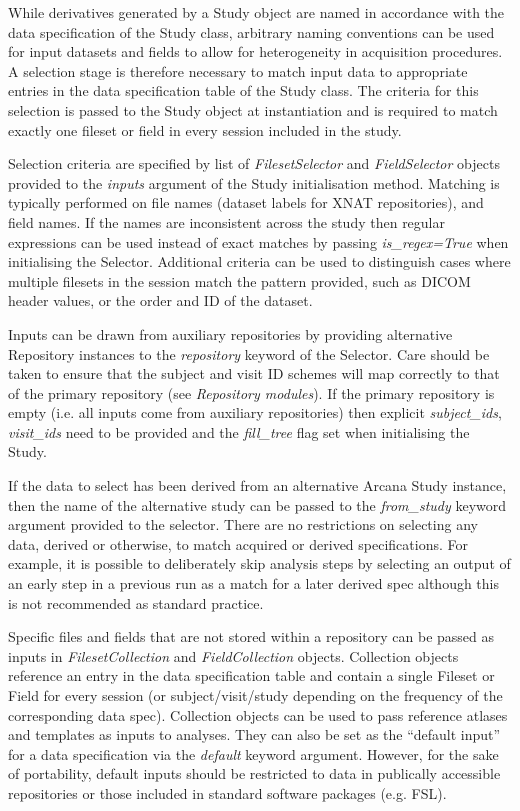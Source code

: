 \documentclass[smallextended]{svjour3}       %
\begin{document}
While derivatives generated by a Study object are named in accordance
with the data specification of the Study class, arbitrary naming
conventions can be used for input datasets and fields to allow for
heterogeneity in acquisition procedures. A selection stage is therefore
necessary to match input data to appropriate entries in the data
specification table of the Study class. The criteria for this selection
is passed to the Study object at instantiation and is required to match
exactly one fileset or field in every session included in the study.

Selection criteria are specified by list of \emph{FilesetSelector} and
\emph{FieldSelector} objects provided to the \emph{inputs} argument of
the Study initialisation method. Matching is typically performed on file
names (dataset labels for XNAT repositories), and field names. If the
names are inconsistent across the study then regular expressions can be
used instead of exact matches by passing \emph{is\_regex=True} when
initialising the Selector. Additional criteria can be used to
distinguish cases where multiple filesets in the session match the
pattern provided, such as DICOM header values, or the order and ID
of the dataset.

Inputs can be drawn from auxiliary repositories by providing alternative
Repository instances to the \emph{repository} keyword of the Selector.
Care should be taken to ensure that the subject and visit ID schemes
will map correctly to that of the primary repository (see
\emph{Repository modules}). If the primary repository is empty (i.e. all
inputs come from auxiliary repositories) then explicit
\emph{subject\_ids}, \emph{visit\_ids} need to be provided and the
\emph{fill\_tree} flag set when initialising the Study.

If the data to select has been derived from an alternative Arcana Study
instance, then the name of the alternative study can be passed to the
\emph{from\_study} keyword argument provided to the selector. There are
no restrictions on selecting any data, derived or otherwise, to match
acquired or derived specifications. For example, it is possible to
deliberately skip analysis steps by selecting an output of an early step
in a previous run as a match for a later derived spec although this is
not recommended as standard practice.

Specific files and fields that are not stored within a repository can be
passed as inputs in \emph{FilesetCollection} and \emph{FieldCollection}
objects. Collection objects reference an entry in the data specification
table and contain a single Fileset or Field for every session (or
subject/visit/study depending on the frequency of the corresponding data
spec). Collection objects can be used to pass reference atlases and
templates as inputs to analyses. They can also be set as the ``default
input'' for a data specification via the \emph{default} keyword
argument. However, for the sake of portability, default inputs should be
restricted to data in publically accessible repositories or those included in
standard software packages (e.g. FSL).
\end{document}
